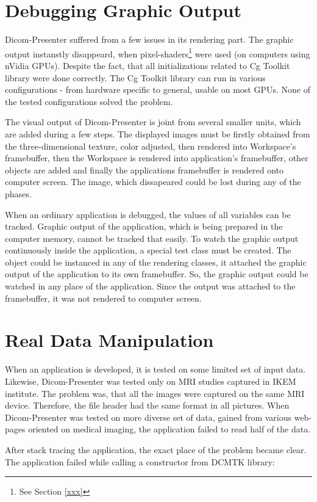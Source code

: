 \section{Debugging Graphic Output}
Dicom-Presenter suffered from a few issues in its rendering part. The graphic output instanstly disappeard, when pixel-shaders\footnote{See Section \ref{xxx}} were used (on computers using nVidia GPUs). Despite the fact, that all initializations related to Cg Toolkit library were done correctly. The Cg Toolkit library can run in various configurations - from hardware specific to general, usable on most GPUs. None of the tested configurations solved the problem.

The visual output of Dicom-Presenter is joint from several smaller units, which are added during a few steps. The displayed images must be firstly obtained from the three-dimensional texture, color adjusted, then rendered into Workspace's framebuffer, then the Workspace is rendered into application's framebuffer, other objects are added and finally the applications framebuffer is rendered onto computer screen. The image, which dissapeared could be lost during any of the phases.

When an ordinary application is debugged, the values of all variables can be tracked. Graphic output of the application, which is being prepared in the computer memory, cannot be tracked that easily. To watch the graphic output continuously inside the application, a special test class must be created. The object could be instanced in any of the rendering classes, it attached the graphic output of the application to its own framebuffer. So, the graphic output could be watched in any place of the application. Since the output was attached to the framebuffer, it was not rendered to computer screen.

\section{Real Data Manipulation}
When an application is developed, it is tested on some limited set of input data. Likewise, Dicom-Presenter was tested only on MRI studies captured in IKEM institute. The problem was, that all the images were captured on the same MRI device. Therefore, the file header had the same format in all pictures. When Dicom-Presenter was tested on more diverse set of data, gained from various web-pages oriented on medical imaging, the application failed to read half of the data.

After stack tracing the application, the exact place of the problem became clear. The application failed while calling a constructor from DCMTK library:

